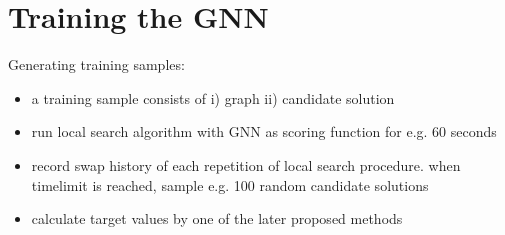 \documentclass[draft,final]{vutinfth} %
\begin{document}
\section{Training the GNN}\label{sec:gnn-training}
Generating training samples: 
\begin{itemize}
    \item a training sample consists of i) graph ii) candidate solution
    \item run local search algorithm with GNN as scoring function for e.g. 60 seconds 
    \item record swap history of each repetition of local search procedure. when timelimit is reached, sample e.g. 100 random candidate solutions 
    \item calculate target values by one of the later proposed methods
\end{itemize}
\end{document}
